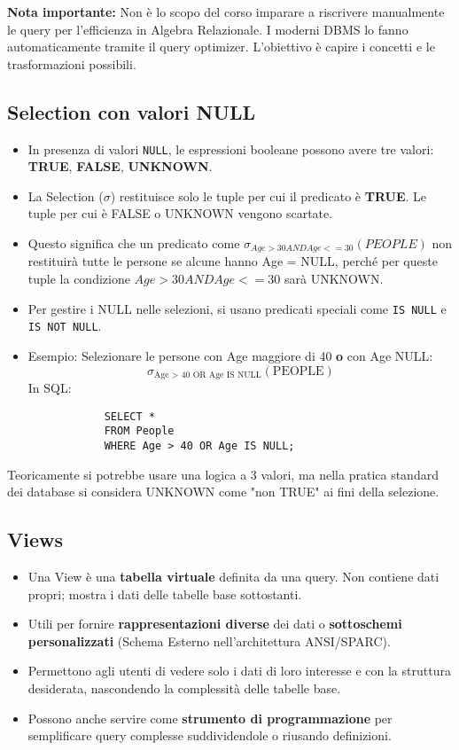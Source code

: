 \documentclass{article}
\begin{document}
	\textbf{Nota importante:} Non è lo scopo del corso imparare a riscrivere manualmente le query per l'efficienza in Algebra Relazionale. I moderni DBMS lo fanno automaticamente tramite il query optimizer. L'obiettivo è capire i concetti e le trasformazioni possibili.
	
	\subsection{Selection con valori NULL}
	\begin{itemize}
		\item In presenza di valori \texttt{NULL}, le espressioni booleane possono avere tre valori: \textbf{TRUE}, \textbf{FALSE}, \textbf{UNKNOWN}.
		\item La Selection ($\sigma$) restituisce solo le tuple per cui il predicato è \textbf{TRUE}. Le tuple per cui è FALSE o UNKNOWN vengono scartate.
		\item Questo significa che un predicato come $\sigma_{Age > 30 AND Age <= 30}(PEOPLE)$ non restituirà tutte le persone se alcune hanno Age = NULL, perché per queste tuple la condizione $Age > 30 AND Age <= 30$ sarà UNKNOWN.
		\item Per gestire i NULL nelle selezioni, si usano predicati speciali come \texttt{IS NULL} e \texttt{IS NOT NULL}.
		\item Esempio: Selezionare le persone con Age maggiore di 40 \textbf{o} con Age NULL:
		$$ \sigma_{\text{Age > 40 OR Age IS NULL}}(\text{PEOPLE}) $$
		In SQL:
		\begin{verbatim}
			SELECT *
			FROM People
			WHERE Age > 40 OR Age IS NULL;
		\end{verbatim}
	\end{itemize}
	Teoricamente si potrebbe usare una logica a 3 valori, ma nella pratica standard dei database si considera UNKNOWN come "non TRUE" ai fini della selezione.
	
	\subsection{Views}
	\begin{itemize}
		\item Una View è una \textbf{tabella virtuale} definita da una query. Non contiene dati propri; mostra i dati delle tabelle base sottostanti.
		\item Utili per fornire \textbf{rappresentazioni diverse} dei dati o \textbf{sottoschemi personalizzati} (Schema Esterno nell'architettura ANSI/SPARC).
		\item Permettono agli utenti di vedere solo i dati di loro interesse e con la struttura desiderata, nascondendo la complessità delle tabelle base.
		\item Possono anche servire come \textbf{strumento di programmazione} per semplificare query complesse suddividendole o riusando definizioni.
	\end{itemize}
	
\end{document}
